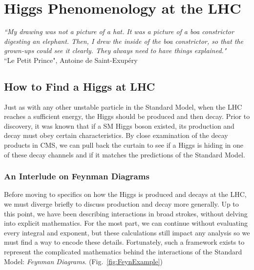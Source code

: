 \chapter{Higgs Phenomenology at the LHC}
\label{sec:pheno}

\begin{center}
\begin{footnotesize}
{\it{``My drawing was not a picture of a hat. It was a picture of a boa constrictor digesting an elephant. Then, I drew the inside of the boa constrictor, so that the grown-ups could see it clearly. They always need to have things explained."}}\\
``Le Petit Prince", Antoine de Saint-Exup\'ery
\end{footnotesize}
\end{center}

\section{How to Find a Higgs at LHC}
\label{sec:LHCHiggs}

Just as with any other unstable particle in the Standard Model, when the LHC reaches a sufficient energy, the Higgs should be produced and then decay. Prior to discovery, it was known that if a SM Higgs boson existed, its production and decay must obey certain characteristics. By close examination of the decay products in CMS, we can pull back the curtain to see if a Higgs is hiding in one of these decay channels and if it matches the predictions of the Standard Model.

\subsection{An Interlude on Feynman Diagrams}
\label{sec:FeynDiagrams}

Before moving to specifics on how the Higgs is produced and decays at the LHC, we must diverge briefly to discuss production and decay more generally. Up to this point, we have been describing interactions in broad strokes, without delving into explicit mathematics. For the most part, we can continue without evaluating every integral and exponent, but these calculations still impact any analysis so we must find a way to encode these details. Fortunately, such a framework exists to represent the complicated mathematics behind the interactions of the Standard Model: \textit{Feynman Diagrams}. (Fig.~\ref{fig:FeynExample})

